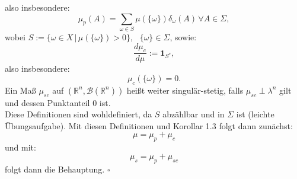 \documentclass[11pt,english]{smfart}
\newcommand*{\QEDB}{\null\nobreak\hfill\ensuremath{\square}}
\begin{document}
also insbesondere:
\begin{equation}
    \mu_p (A) = \sum_{\omega \in S} \mu(\{\omega\}) \delta_{\omega}(A) \, \forall A \in \Sigma,
\end{equation}
wobei \(S := \{\omega \in X \, | \, \mu(\{\omega\}) > 0\}\), \, \(\{\omega\} \in \Sigma\), sowie:
\begin{equation}
    \frac{d\mu_c}{d\mu} := \textbf{1}_{S^c},
\end{equation}
also insbesondere:
\begin{equation}
    \mu_c(\{\omega\}) = 0.
\end{equation}
Ein Maß \(\mu_{sc}\) auf \((\mathbb{R}^n,\mathcal{B}(\mathbb{R}^n))\) heißt weiter singulär-stetig, falls \(\mu_{sc} \perp \lambda^n\) gilt und dessen Punktanteil 0 ist.\\
Diese Definitionen sind wohldefiniert, da \(S\) abzählbar und in \(\Sigma\) ist (leichte Übungsaufgabe). Mit diesen Definitionen und Korollar 1.3 folgt dann zunächst:
\begin{equation}
    \mu = \mu_p + \mu_c
\end{equation}
und mit:
\begin{equation}
    \mu_s = \mu_p + \mu_{sc}
\end{equation}
folgt dann die Behauptung. \QEDB
\end{document}
